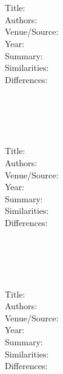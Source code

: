 \documentclass[letterpaper,12pt]{article}
\begin{document}
\section{~\cite{}}
\begin{description}
 \item[Title:] 
 \item[Authors:] 
 \item[Venue/Source:] 
 \item[Year:] 
 \item[Summary:] 
 \item[Similarities:] 
 \item[Differences:] 
\end{description}

\section{~\cite{}}
\begin{description}
 \item[Title:] 
 \item[Authors:] 
 \item[Venue/Source:] 
 \item[Year:] 
 \item[Summary:] 
 \item[Similarities:] 
 \item[Differences:] 
\end{description}

\section{~\cite{}}
\begin{description}
 \item[Title:] 
 \item[Authors:] 
 \item[Venue/Source:] 
 \item[Year:] 
 \item[Summary:] 
 \item[Similarities:] 
 \item[Differences:] 
\end{description}



\end{document}
